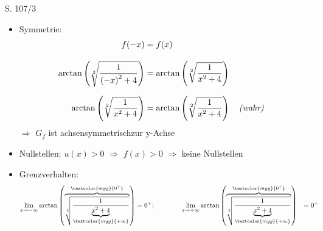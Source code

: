 \begin{Exercise}{S. 107/3}{}
\begin{enumerate}
\begin{enumerate}[label=\alph*),leftmargin=*]
{\begin{itemize}[leftmargin=*]
{\begin{minipage}[t]{0.5\linewidth}
\begin{align*}
                            v(x) &= 0 \qquad \Rightarrow \quad z(x) > 0&&
                        \end{align*}
                        $\Rightarrow$ \quad keine Nullstellen\\[-1.0ex]
                        \\[2.0ex]
                    \end{minipage}
                    $\Rightarrow \quad \uuline{D_{f} = \mathbb{R}}$\\[-2.0ex]
                    }
                \item Symmetrie: \\[-4.0ex]{
                    \begin{align*}
                        f(-x) &= f(x) &&\\[2.0ex]
                        \arctan\left(\sqrt[2]{\dfrac{1}{\left(-x\right)^{2}+4}}\right) &= \arctan\left(\sqrt[2]{\dfrac{1}{x^{2}+4}}\right) &&\\[1.5ex]
                        \arctan\left(\sqrt[2]{\dfrac{1}{x^{2}+4}}\right) &= \arctan\left(\sqrt[2]{\dfrac{1}{x^{2}+4}}\right) \quad \text{\textit{(wahr)}} &&
                    \end{align*}
                    $\Rightarrow$ \quad $G_f$ ist achsensymmetrischzur y-Achse\\[-2.0ex]
                    }
                \item Nullstellen: \qquad $u(x) > 0$ \qquad $\Rightarrow$ \qquad $f(x) > 0$ \qquad $\Rightarrow$ \quad keine Nullstellen\\[-2.0ex]
                \item Grenzverhalten: \\[-3.0ex]{
                    \begin{align*}
                        \lim\limits_{x \to -\infty} \arctan\left(\overbrace{\sqrt[2]{\dfrac{1}{\underbrace{x^{2}+4}_{\textcolor{myg}{+\infty}}}}}^{\textcolor{myg}{0^{+}}}\right) &= 0^{+}; \qquad \qquad \lim\limits_{x \to +\infty} \arctan\left(\overbrace{\sqrt[2]{\dfrac{1}{\underbrace{x^{2}+4}_{\textcolor{myg}{+\infty}}}}}^{\textcolor{myg}{0^{+}}}\right) &= 0^{+} &&\\[-5.0ex]

\end{align*}}
\end{itemize}}
\end{enumerate}
\end{enumerate}
\end{Exercise}

